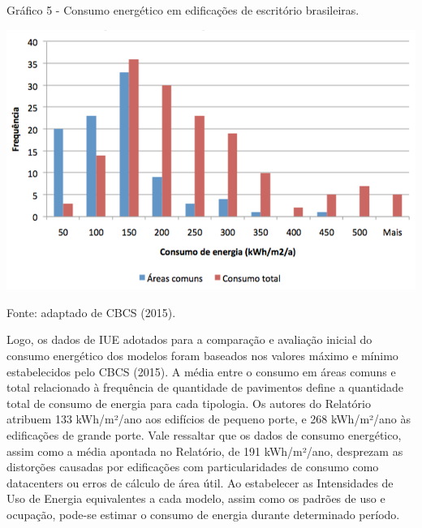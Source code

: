     \begin{graph}
        \par \small Gráfico 5 - Consumo energético em edificações de escritório brasileiras.
        \begin{minipage}[ht]{1\textwidth}\centering
            \includegraphics[width=1.0\textwidth]{figures/fig9_consumo-total-das-edificacoes-levantadas_cbcs_2015.png}            
        \end{minipage}
        \begin{flushleft}
            \par \small Fonte: adaptado de CBCS (2015).
        \end{flushleft}
    \end{graph}

\noindent Logo, os dados de IUE adotados para a comparação e avaliação inicial do consumo energético dos modelos foram baseados nos valores máximo e mínimo estabelecidos pelo CBCS (2015). A média entre o consumo em áreas comuns e total relacionado à frequência de quantidade de pavimentos define a quantidade total de consumo de energia para cada tipologia.\vspace*{0.3cm} \newline
Os autores do Relatório atribuem 133 kWh/m²/ano aos edifícios de pequeno porte, e 268 kWh/m²/ano às edificações de grande porte. Vale ressaltar que os dados de consumo energético, assim como a média apontada no Relatório, de 191 kWh/m²/ano, desprezam as distorções causadas por edificações com particularidades de consumo como datacenters ou erros de cálculo de área útil.\vspace*{0.3cm} \newline
Ao estabelecer as Intensidades de Uso de Energia equivalentes a cada modelo, assim como os padrões de uso e ocupação, pode-se estimar o consumo de energia durante determinado período.

